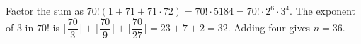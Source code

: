 Factor the sum as $70!(1+71+71\cdot72)=70!\cdot5184=70!\cdot2^6\cdot3^4$. The exponent of $3$ in $70!$ is $\lfloor\dfrac{70}{3}\rfloor+\lfloor\dfrac{70}{9}\rfloor+\lfloor\dfrac{70}{27}\rfloor=23+7+2=32$. Adding four gives $n=\boxed{36}$.
